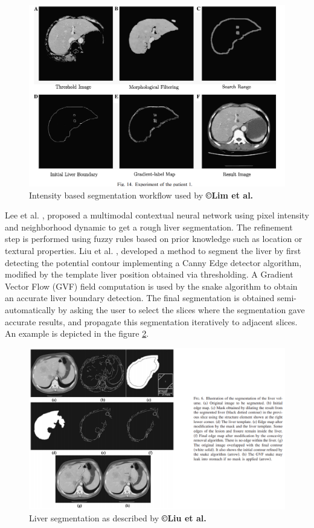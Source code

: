 \documentclass[]{article}
\begin{document}
	\begin{figure}[ht!]
		\centering
		\includegraphics[width=0.7\linewidth]{images/image10}
		\caption{Intensity based segmentation workflow used by \textbf{©Lim et al.}  \cite{Lim2006}}
		\label{IntensityBasedLim}
	\end{figure}
	
	Lee et al. \cite{Lee2003}, proposed a multimodal contextual neural network using
	pixel intensity and neighborhood dynamic to get a rough liver
	segmentation. The refinement step is performed using fuzzy rules based
	on prior knowledge such as location or textural properties.
	Liu et al. \cite{Liu2005}, developed a method to segment the liver by first detecting the potential
	contour implementing a Canny Edge detector algorithm, modified by the
	template liver position obtained via thresholding. A Gradient Vector
	Flow (GVF) field computation is used by the snake algorithm to obtain an
	accurate liver boundary detection. The final segmentation is obtained
	semi-automatically by asking the user to select the slices where the
	segmentation gave accurate results, and propagate this segmentation
	iteratively to adjacent slices. An example is depicted in the figure \ref{LiuGVF}.
	\begin{figure} [ht!]
		\centering
		\includegraphics[width=0.7\linewidth]{images/image15}
		\caption{Liver segmentation as described by \textbf{©Liu et al.} \cite{Liu2005}}
		\label{LiuGVF}
	\end{figure}
	
\end{document}
